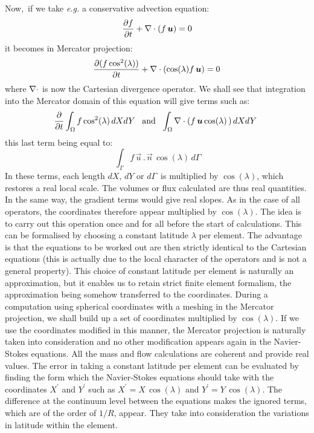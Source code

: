 Now,\ if we take \textit{e.g.} a conservative advection equation:%
\begin{equation}
  \dfrac{\partial f}{\partial t}+\nabla \cdot(f\,\bm{u})=0
\end{equation}
it becomes in Mercator projection:%
\begin{equation}
  \dfrac{\partial(f\cos^{2}(\lambda))}{\partial t}+\nabla \cdot(\cos(\lambda)f\,\bm{u})=0
\end{equation}
where $\nabla \cdot$ is now the Cartesian divergence operator.
We shall see that integration into the Mercator domain of this equation will
give terms such as:%
\[\dfrac{\partial}{\partial t}\int\nolimits_{\Omega}f\cos^{2}(\lambda
)\,dXdY\,\,\text{\thinspace\ and}\,\,\,\,\int\nolimits_{\Omega}\Div(f\,\vec
{u}\cos(\lambda)\,)\,dXdY\,\,\]
this last term being equal to:%
\[\,\int\nolimits_{\Gamma}f\,\vec{u}\,.\,\vec{n}\,\cos(\lambda)\,d\Gamma\]
In these terms, each length $dX$, $dY$ or $d\Gamma$\ is multiplied by
$\cos(\lambda)$, which restores a real local scale. The volumes or flux
calculated are thus real quantities. In the same way, the gradient terms would
give real slopes.
As in the case of all operators, the coordinates therefore appear multiplied
by $\cos(\lambda)$. The idea is to carry out this operation once and for all
before the start of calculations. This can be formalised by choosing a
constant latitude $\lambda$ per element. The advantage is that the equations
to be worked out are then strictly identical to the Cartesian equations (this
is actually due to the local character of the operators and is not a general
property). This choice of constant latitude per element is naturally an
approximation, but it enables us to retain strict finite element formalism,
the approximation being somehow transferred to the coordinates.
During a computation using spherical coordinates with a meshing in the
Mercator projection, we shall build up a set of coordinates multiplied by
$\cos(\lambda)$. If we use the coordinates modified in this manner, the
Mercator projection is naturally taken into consideration and no other
modification appears again in the Navier-Stokes equations. All the mass and
flow calculations are coherent and provide real values.
The error in taking a constant latitude per element can be evaluated by
finding the form which the Navier-Stokes equations should take with the
coordinates $X^{\prime}$ and $Y^{\prime}$ such as $X^{\prime}=X\,\cos
(\lambda)$ and $Y^{\prime}=Y\,\cos(\lambda)$. The difference at the continuum
level between the equations makes the ignored terms, which are of the order of
$1/R$, appear. They take into consideration the variations in latitude within
the element.

